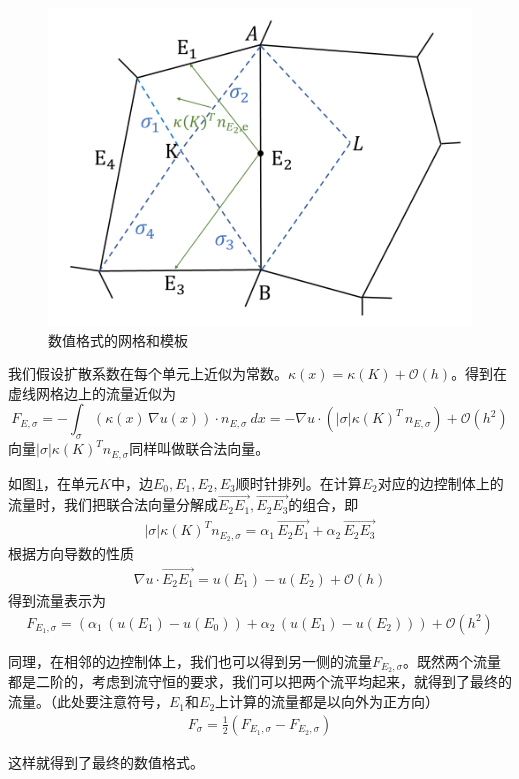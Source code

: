 \documentclass[12pt,a4paper]{article}
\theoremstyle{plain}
\begin{document}
\begin{figure}[h]
\centering
\includegraphics[width=0.5\linewidth]{stencil.png}
\caption{数值格式的网格和模板}
\label{f1}
\end{figure}

我们假设扩散系数在每个单元上近似为常数。$\kappa(x) = \kappa(K) + \mathcal{O}(h)$。得到在虚线网格边上的流量近似为
\begin{equation*}
F_{E, \sigma} = - \int_{\sigma} (\kappa(x) \, \nabla u(x)) \cdot n_{E, \sigma} \ dx = - \nabla u \cdot (|\sigma| \kappa(K)^T \, n_{E, \sigma}) + \mathcal{O}(h^2)
\end{equation*}
向量$|\sigma| \kappa(K)^T n_{E, \sigma}$同样叫做联合法向量。

如图\ref{f1}，在单元$K$中，边$E_0,E_1,E_2,E_3$顺时针排列。在计算$E_2$对应的边控制体上的流量时，我们把联合法向量分解成$\overrightarrow{E_2 E_1}, \overrightarrow{E_2 E_3}$的组合，即
\begin{align*}
|\sigma| \kappa(K)^T n_{E_2, \sigma} = \alpha_1 \, \overrightarrow{E_2 E_1} + \alpha_2 \, \overrightarrow{E_2 E_3}
\end{align*}
根据方向导数的性质
\begin{align*}
\nabla u \cdot \overrightarrow{E_2 E_1} = u(E_1) - u(E_2) + \mathcal{O}(h)
\end{align*}
得到流量表示为
\begin{align*}
F_{E_1, \sigma} = (\alpha_{1} \, (u(E_1) - u(E_0)) + \alpha_{2} \, (u(E_1) - u(E_2))) + \mathcal{O}(h^2)
\end{align*}

同理，在相邻的边控制体上，我们也可以得到另一侧的流量$F_{E_2, \sigma}$。既然两个流量都是二阶的，考虑到流守恒的要求，我们可以把两个流平均起来，就得到了最终的流量。（此处要注意符号，$E_1$和$E_2$上计算的流量都是以向外为正方向）
\begin{align*}
F_{\sigma} = \frac12 (F_{E_1, \sigma} - F_{E_2, \sigma})
\end{align*}

这样就得到了最终的数值格式。
\end{document}
